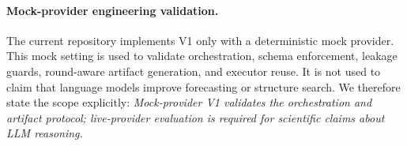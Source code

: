 \paragraph{Mock-provider engineering validation.}
The current repository implements V1 only with a deterministic mock provider.
This mock setting is used to validate orchestration, schema enforcement,
leakage guards, round-aware artifact generation, and executor reuse. It is not
used to claim that language models improve forecasting or structure search. We
therefore state the scope explicitly:
\emph{Mock-provider V1 validates the orchestration and artifact protocol; live-provider evaluation is required for scientific claims about LLM reasoning.}
